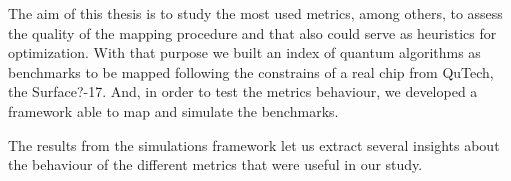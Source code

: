 
The aim of this thesis is to study the most used metrics, among others, to assess the quality of the mapping procedure and that also could serve as heuristics for optimization.
With that purpose we built an index of quantum algorithms as benchmarks to be mapped following the constrains of a real chip from QuTech, the Surface?-17.
And, in order to test the metrics behaviour, we developed a framework able to map and simulate the benchmarks.


The results from the simulations framework let us extract several insights about the behaviour of the different metrics that were useful in our study.

\begin{comment}
\begin{flushright}
{\makeatletter\itshape
    \@author \\
    Delft, February 2019
\makeatother}
\end{flushright}
\end{comment}
